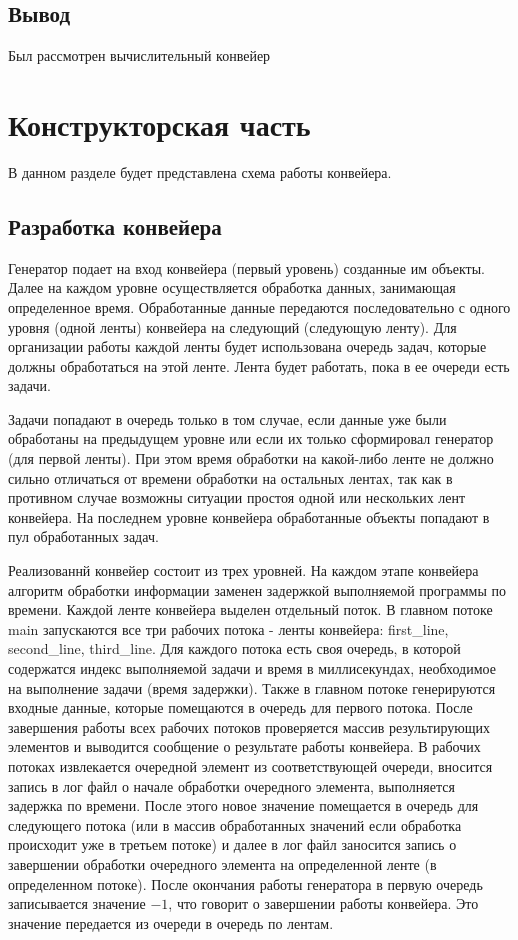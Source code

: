 \documentclass[a4paper, 14pt]{article}
\begin{document}
	\subsection{Вывод}
	Был рассмотрен вычислительный конвейер 
	
	\newpage
	\section{Конструкторская часть}
	
	В данном разделе будет представлена схема работы конвейера.
	
	\subsection{Разработка конвейера}
	
	 Генератор подает на вход конвейера (первый уровень) созданные им объекты. Далее на каждом уровне осуществляется обработка данных, занимающая определенное время. Обработанные данные передаются последовательно с одного уровня (одной ленты) конвейера на следующий (следующую ленту). Для организации работы каждой ленты будет использована очередь задач, которые должны обработаться на этой ленте. Лента будет работать, пока в ее очереди есть задачи. 
 
 Задачи попадают в очередь только в том случае, если данные уже были обработаны на предыдущем уровне или если их только сформировал генератор (для первой ленты). При этом время обработки на какой-либо ленте не должно сильно отличаться от времени обработки на остальных лентах, так как в противном случае возможны ситуации простоя одной или нескольких лент конвейера. На последнем уровне конвейера обработанные объекты попадают в пул обработанных задач.
 
Реализованнй конвейер состоит из трех уровней. На каждом этапе конвейера алгоритм обработки информации заменен задержкой выполняемой программы по времени. Каждой ленте конвейера выделен отдельный поток. В главном потоке main запускаются все три рабочих потока - ленты конвейера:  first\_line, second\_line, third\_line. Для каждого потока есть своя очередь, в которой содержатся индекс выполняемой задачи и время в миллисекундах, необходимое на выполнение задачи (время задержки). Также в главном потоке генерируются входные данные, которые помещаются в очередь для первого потока. После завершения работы всех рабочих потоков проверяется массив результирующих элементов и выводится сообщение о результате работы конвейера. В рабочих потоках извлекается очередной элемент из соответствующей очереди, вносится запись в лог файл о начале обработки очередного элемента, выполняется задержка по времени. После этого новое значение помещается в очередь для следующего потока (или в массив обработанных значений если обработка происходит уже в третьем потоке) и далее в лог файл заносится запись о завершении обработки очередного элемента на определенной ленте (в определенном потоке). После окончания работы генератора в первую очередь записывается значение $-1$, что говорит о завершении работы конвейера. Это значение передается из очереди в очередь по лентам. 
	
\end{document}
